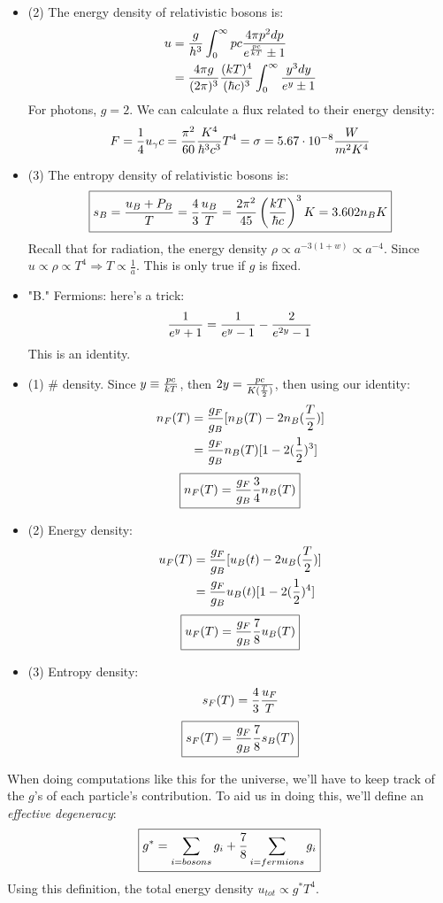 \documentclass{article}
\def\hf{\frac12}
\def\imply{\Rightarrow}
\def\inv#1{\frac{1}{ #1}}
\def\hf{\frac12}
\def\imply{\Rightarrow}
\begin{document}
\begin{itemize}
\item{(2)} The energy density of relativistic bosons is:
\def\epckt{e^{pc\over kT}}
\begin{align}
u&={g\over h^3}\int_0^\infty{pc{4\pi p^2dp\over\epckt\pm 1}}\\
&={4\pi g\over (2\pi)^3}{(kT)^4\over(\hbar c)^3}
\int_0^\infty{y^3dy\over e^y\pm 1}\\
\end{align}$$
$$
For photons, $g=2$.  We can calculate a flux related to their energy density:
$$F=\inv{4}u_\gamma c={\pi^2\over 60}{K^4\over\hbar^3c^3}T^4=
\sigma=5.67\cdot 10^{-8}{W\over m^2K^4}$$
\item{(3)} The entropy density of relativistic bosons is:
$$\boxed{s_B={u_B+P_B\over T}={4\over 3}{u_B\over T}
={2\pi^2\over45}\left({kT\over\hbar c}\right)^3K=3.602n_BK}$$
Recall that for radiation, the energy density 
$\rho\propto a^{-3(1+w)}\propto a^{-4}$.  Since 
$u\propto\rho\propto T^4\imply T\propto\inv{a}$.
This is only true if $g$ is fixed.
\item"B." Fermions: here's a trick:
$$\inv{e^y+1}=\inv{e^y-1}-{2\over e^{2y}-1}$$
This is an identity.  
\item{(1)} \# density. Since $y\equiv {pc\over kT}$, then
$2y={pc\over K({T\over 2})}$, then using our identity:
\begin{align}
n_F(T)&={g_F\over g_B}[n_B(T)-2n_B({T\over 2})]\\
&={g_F\over g_B}n_B(T)[1-2(\hf)^3]\\
\end{align}
$$\boxed{n_F(T)={g_F\over g_B}{3\over 4}n_B(T)}$$
\item{(2)} Energy density:
\def\gfgb{{g_F\over g_B}}
\begin{align}
u_F(T)&=\gfgb[u_B(t)-2u_B({T\over 2})]\\
&=\gfgb u_B(t)[1-2(\hf)^4]\\
\end{align}
$$\boxed{u_F(T)=\gfgb{7\over 8}u_B(T)}$$
\item{(3)} Entropy density:
$$s_F(T)={4\over 3}{u_F\over T}$$
$$\boxed{s_F(T)=\gfgb {7\over 8}s_B(T)}$$
\end{itemize}
When doing computations like this for the universe, we'll have to keep track
of the $g$'s of each particle's contribution.  To aid us in doing this, we'll
define an {\it effective degeneracy}:
$$\boxed{g^*=\sum_{i=bosons}{g_i}+{7\over 8}\sum_{i=fermions}{g_i}}$$
Using this definition, the total energy density $u_{tot}\propto g^*T^4$.
\end{document}
